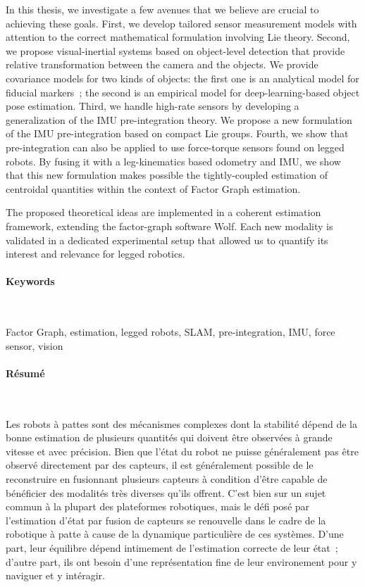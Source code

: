In this thesis, we investigate a few avenues that we believe are crucial to achieving these goals. First, we develop tailored sensor measurement models 
with attention to the correct mathematical formulation involving Lie theory.
Second, we propose visual-inertial systems based on object-level detection that provide relative transformation between the camera and the objects.
We provide covariance models for two kinds of objects: the first one is an analytical model for fiducial markers~; the second
is an empirical model for deep-learning-based object pose estimation.
Third, we handle high-rate sensors by developing a generalization of the IMU pre-integration theory. We propose a new formulation of the IMU
pre-integration based on compact Lie groups. 
Fourth, we show that pre-integration can also be applied to use force-torque sensors found on legged robots. 
By fusing it with a leg-kinematics based odometry and IMU, we show that this new formulation makes possible the tightly-coupled estimation
of centroidal quantities within the context of Factor Graph estimation.

The proposed theoretical ideas are implemented in a coherent estimation framework, extending the factor-graph software Wolf. Each new modality is 
validated in a dedicated experimental setup that allowed us to quantify its interest and relevance for legged robotics.



\paragraph{Keywords}~

Factor Graph, estimation, legged robots, SLAM, pre-integration, IMU, force sensor, vision 

\noindent\makebox[\linewidth]{\rule{0.6\textwidth}{2pt}}



\newpage


\noindent\makebox[\linewidth]{\rule{0.6\textwidth}{2pt}}


\paragraph{Résumé}~

Les robots à pattes sont des mécanismes complexes dont la stabilité dépend de la bonne estimation de plusieurs quantités 
qui doivent être observées à grande vitesse et avec précision. Bien que l'état du robot ne puisse généralement pas être observé directement par 
des capteurs, il est généralement possible de le reconstruire en fusionnant plusieurs capteurs à condition d'être capable de
bénéficier des modalités très diverses qu'ils offrent.
C'est bien sur un sujet commun à la plupart des plateformes robotiques, mais le défi posé par l'estimation d'état par fusion de capteurs
se renouvelle dans le cadre de la robotique à patte à cause de la dynamique particulière de ces systèmes. D'une part, leur équilibre
dépend intimement de l'estimation correcte de leur état~; d'autre part, ils ont besoin d'une représentation fine de leur environement
pour y naviguer et y intéragir.

